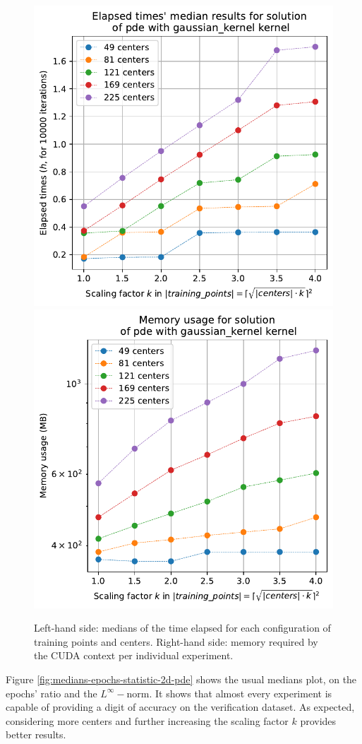 \documentclass[12pt]{report} %
\begin{document}
\begin{figure}[ht]
  \centering
  \includegraphics[width=.45\textwidth]{imagenes/experiments/2d/pde_fornberg_wright/medians_elapsed_times_pde_gaussian_kernel.pdf}
  \includegraphics[width=.45\textwidth]{imagenes/experiments/2d/pde_fornberg_wright/memory_usage_pde_gaussian_kernel.pdf}
  \caption{Left-hand side: medians of the time elapsed for each configuration of training points and centers. Right-hand side: memory required by the CUDA context per individual experiment.}
  \label{fig:medians-times-storage-2d-pde}
\end{figure}


Figure \ref{fig:medians-epochs-statistic-2d-pde} shows the usual medians plot, on the epochs' ratio and the $L^\infty-$norm. It shows that almost every experiment is capable of providing a digit of accuracy on the verification dataset. As expected, considering more centers and further increasing the scaling factor $k$ provides better results. 
\end{document}
